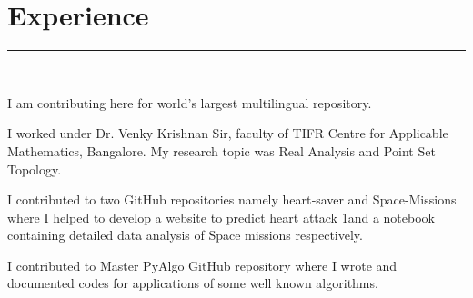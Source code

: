 \documentclass[]{debjitpal-resume}
\begin{document}
\begin{minipage}[t]{0.6\textwidth}
\section{Experience}
\noindent\rule{12.5cm}{0.4pt}
 \\
\noindent
\hspace{4em}%
\begin{minipage}{0.85\textwidth\vspace{2pt}}
I am contributing here for world's largest multilingual repository.
\end{minipage}
\sectionsep
{} 
\noindent
\hspace{4em}%
\begin{minipage}{0.85\textwidth\vspace{2pt}}
I worked under Dr. Venky Krishnan Sir, faculty of TIFR Centre for Applicable Mathematics, Bangalore. My research topic was Real Analysis and Point Set Topology.\\
\end{minipage}
\sectionsep
{} 
\noindent
\hspace{4em}%
\begin{minipage}{0.85\textwidth\vspace{2pt}}
I contributed to two GitHub repositories namely heart‐saver and Space‐Missions where I helped to develop a website to predict heart attack 1and a notebook containing detailed data analysis of Space missions respectively.\\
\end{minipage}
\sectionsep
{} 
\noindent
\hspace{4em}%
\begin{minipage}{0.85\textwidth\vspace{2pt}}
I contributed to Master PyAlgo GitHub repository where I wrote and documented codes for applications of some well known algorithms.\\
\end{minipage}

\end{minipage}
\end{document}
